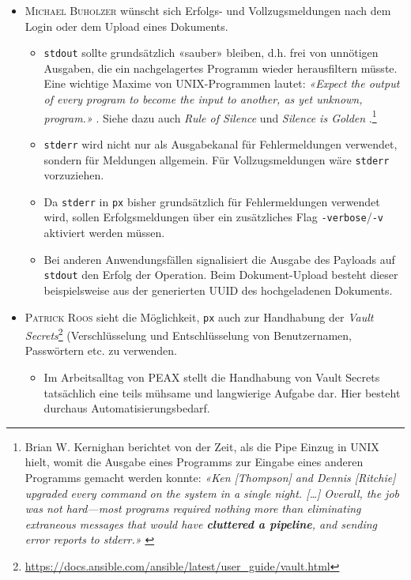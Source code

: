 \begin{itemize}
    \item \textsc{Michael Buholzer} wünscht sich Erfolgs- und Vollzugsmeldungen nach dem Login oder dem Upload eines Dokuments.
    \begin{itemize}
        \item \texttt{stdout} sollte grundsätzlich «sauber» bleiben, d.h. frei von unnötigen Ausgaben, die ein nachgelagertes Programm wieder herausfiltern müsste. Eine wichtige Maxime von UNIX-Programmen lautet: \textit{«Expect the output of every program to become the input to another, as yet unknown, program.»} \cite[p. 3]{unixtimesharing}. Siehe dazu auch \textit{Rule of Silence} \cite[p. 20]{unixart} und \textit{Silence is Golden} \cite[p. 111]{unixphil}.\footnote{Brian W. Kernighan berichtet von der Zeit, als die Pipe Einzug in UNIX hielt, womit die Ausgabe eines Programms zur Eingabe eines anderen Programms gemacht werden konnte: \textit{«Ken [Thompson] and Dennis [Ritchie] upgraded every command on the system in a single night. […] Overall, the job was not hard—most programs required nothing more than eliminating extraneous messages that would have \textbf{cluttered a pipeline}, and sending error reports to stderr.»} \cite[p. 69]{unix-history-memoir}}
        \item \texttt{stderr} wird nicht nur als Ausgabekanal für Fehlermeldungen verwendet, sondern für Meldungen allgemein. Für Vollzugsmeldungen wäre \texttt{stderr} vorzuziehen.
        \item Da \texttt{stderr} in \texttt{px} bisher grundsätzlich für Fehlermeldungen verwendet wird, sollen Erfolgsmeldungen über ein zusätzliches Flag \texttt{-verbose}/\texttt{-v} aktiviert werden müssen.
        \item Bei anderen Anwendungsfällen signalisiert die Ausgabe des Payloads auf \texttt{stdout} den Erfolg der Operation. Beim Dokument-Upload besteht dieser beispielsweise aus der generierten UUID des hochgeladenen Dokuments.
    \end{itemize}
\item \textsc{Patrick Roos} sieht die Möglichkeit, \texttt{px} auch zur Handhabung der \textit{Vault Secrets}\footnote{\url{https://docs.ansible.com/ansible/latest/user_guide/vault.html}} (Verschlüsselung und Entschlüsselung von Benutzernamen, Passwörtern etc. zu verwenden.
    \begin{itemize}
        \item Im Arbeitsalltag von PEAX stellt die Handhabung von Vault Secrets tatsächlich eine teils mühsame und langwierige Aufgabe dar. Hier besteht durchaus Automatisierungsbedarf.

\end{itemize}
\end{itemize}
